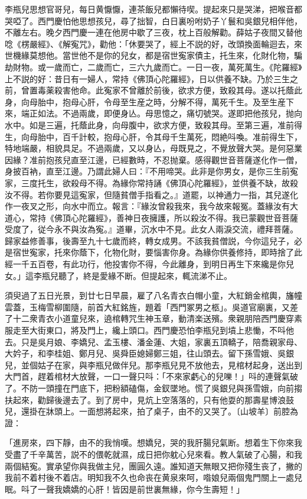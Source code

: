 李瓶兒思想官哥兒，每日黄懨懨，連茶飯兒都懶待喫。提起來只是哭涕，把喉音都哭啞了。西門慶怕他思想孩兒，尋了拙智，白日裏吩咐奶子丫鬟和吳銀兒相伴他，不離左右。晚夕西門慶一連在他房中歇了三夜，枕上百般解勸。薛姑子夜間又替他唸《楞嚴經》、《解寃咒》，勸他：「休要哭了，經上不説的好，改頭換面輪迴去，來世機緣莫想他。當世他不是你的兒女，都是宿世寃家債主，托生來，化財化物，騙劫財物。或一歲而亡，二歲而亡，三六九歲而亡。一日一夜，萬死萬生。《陀羅經》上不説的好：昔日有一婦人，常持《佛頂心陀羅經》，日以供養不缺。乃於三生之前，曾置毒薬殺害他命。此寃家不曾離於前後，欲求方便，致殺其母。遂以托蔭此身，向母胎中，抱母心肝，令母至生産之時，分解不得，萬死千生。及至生産下來，端正如法。不過兩歲，即便身亾。母思憶之，痛切號哭。遂即把他孩兒，抛向水中。如是三遍，托蔭此身，向母腹中，欲求方便，致殺其母。至第三遍，准前得生，向母胎中，百千計較，抱母心肝，令其母千生萬死，悶絶呌喚。准前得生下，特地端嚴，相貌具足。不過兩歲，又以身亾，母既見之，不覺放聲大哭。是何惡業因緣？准前抱孩兒直至江邊，已經數時，不忍抛棄。感得觀世音菩薩遂化作一僧，身披百衲，直至江邊。乃謂此婦人曰：『不用啼哭。此非是你男女，是你三生前寃家，三度托生，欲殺母不得。為緣你常持誦《佛頂心陀羅經》，並供養不缺，故殺汝不得。若你要見這寃家，但隨貧僧手指看之。』道罷，以神通力一指，其兒遂化作一夜叉之形，向水中而立。報言：『緣汝曾殺我來，我今故來報冤。蓋緣汝有大道心，常持《佛頂心陀羅經》，善神日夜擁護，所以殺汝不得。我已蒙觀世音菩薩受度了，従今永不與汝為寃。』道畢，沉水中不見。此女人兩淚交流，禮拜菩薩。歸家益修善事，後壽至九十七歲而終，轉女成男。不該我貧僧説，今你這兒子，必是宿世寃家，托來你蔭下，化物化財，要惱害你身。為緣你供養修持，即時捨了此經一千五百卷，有此功行，他投害你不得，今此離身，到明日再生下來纔是你兒女。」這李瓶兒聽了，終是愛緣不断。但提起來，輒流涕不止。

須臾過了五日光景，到廿七日早晨，雇了八名青衣白帽小童，大紅銷金棺輿，旛幢雲蓋，玉梅雪柳圍隨，前首大紅銘旌，題着「西門冢男之柩」。吳道官廟裏，又差了十二衆青衣小道童兒來，遶棺轉咒生神玉章，動清楽送殯。衆親朋陪西門慶穿素服走至大街東口，將及門上，纔上頭口。西門慶恐怕李瓶兒到墳上悲慟，不呌他去。只是吳月娘、李嬌兒、孟玉樓、潘金蓮、大姐，家裏五頂轎子，陪喬親家母、大妗子，和李桂姐、鄭月兒、吳舜臣媳婦鄭三姐，往山頭去。留下孫雪娥、吳銀兒，並個姑子在家，與李瓶兒做伴兒。那李瓶兒見不放他去，見棺材起身，送出到大門首，趕着棺材大放聲，一口一聲只呌：「不來家虧心的兒嚛！」呌的連聲氣破了。不防一頭撞在門底下，把粉額磕傷，金釵墜地。慌了吳銀兒與孫雪娥，向前搊扶起來，勸歸後邊去了。到了房中，見炕上空落落的，只有他耍的那壽星博浪鼓兒，還掛在牀頭上。一面想將起來，拍了桌子，由不的又哭了。〔山坡羊〕前腔為證：

\begin{myquote}
「進房來，四下靜，由不的我悄嘆。想嬌兒，哭的我肝腸兒氣断。想着生下你來我受盡了千辛萬苦，説不的偎乾就濕，成日把你躭心兒來看。教人氣破了心腸，和我兩個結寃。實承望你與我做主兒，團圓久遠。誰知道天無眼又把你殘生丧了，撇的我前不着村後不着店。明知我不久也命丧在黄泉來呵，喒娘兒兩個鬼門關上一處兒眠。呌了一聲我嬌嬌的心肝！皆因是前世裏無緣，你今生壽短！」
\end{myquote}

